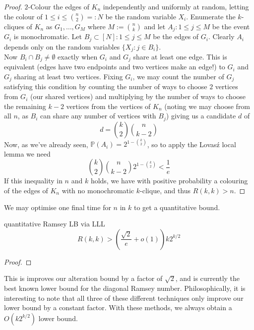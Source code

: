 \documentclass{article}
\begin{document}
\begin{proof}
    $2$-Colour the edges of $K_n$ independently and uniformly at random, letting the colour of $1 \leq i \leq 
    \binom{n}{2}=: N$ be the random variable $X_i$. Enumerate the $k$-cliques of $K_n$ as $G_1, \dots, G_M$ where 
    $M := \binom{n}{k}$ and let $A_j: 1 \leq j \leq M$ be the event $G_i$ is monochromatic. Let 
    $B_j \subset [N]: 1 \leq j \leq M$ be the edges of $G_i$. Clearly $A_i$ depends only on
    the random variables $\{X_j : j \in B_i\}$. \\

    Now $B_i \cap B_j \neq \emptyset$ exactly when $G_i$ and $G_j$ share at least one edge. This is equivalent 
    (edges have two endpoints and two vertices make an edge!) to $G_i$ and $G_j$ sharing at least two vertices. 
    Fixing $G_i$, we may count the number of $G_j$ satisfying this condition by counting the number of ways to 
    choose $2$ vertices from $G_i$ (our shared vertices) and multiplying by the number of ways to choose the remaining 
    $k-2$ vertices from the vertices of $K_n$ (noting we may choose from all $n$, as $B_i$ can share any number of 
    vertices with $B_j$) giving us a candidate $d$ of 
    \[d = \binom{k}{2}\binom{n}{k-2}\]
    Now, as we've already seen, $\mathbb{P}(A_i) = 2^{1 - \binom{k}{2}}$, so to apply the Lovas\'{z} local lemma 
    we need 
    \[\binom{k}{2}\binom{n}{k-2}2^{1 - \binom{k}{2}} < \frac{1}{e}\]
    If this inequality in $n$ and $k$ holds, we have with positive probability a colouring of the edges of $K_n$
    with no monochromatic $k$-clique, and thus $R(k, k) > n$. 
\end{proof}

We may optimise one final time for $n$ in $k$ to get a quantitative bound.

\begin{proposition}[]{quantitative Ramsey LB via LLL}
    \[R(k,k) > \left(\frac{\sqrt{2}}{e} + o(1)\right)k2^{k/2}\]
\end{proposition}

\begin{proof}
    
\end{proof}

This is improves our alteration bound by a factor of $\sqrt{2}$, and is currently the best known lower bound for 
the diagonal Ramsey number. Philosophically, it is interesting to note that all three of these different techniques 
only improve our lower bound by a constant factor. With these methods, we always obtain a $O(k2^{k/2})$ lower bound. \\
\end{document}
